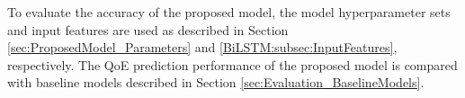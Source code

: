 To evaluate the accuracy of the proposed model, the model hyperparameter sets and input features are used as described in Section \ref{sec:ProposedModel_Parameters} and \ref{BiLSTM:subsec:InputFeatures}, respectively.
The QoE prediction performance of the proposed model is compared with baseline models described in Section \ref{sec:Evaluation_BaselineModels}.
